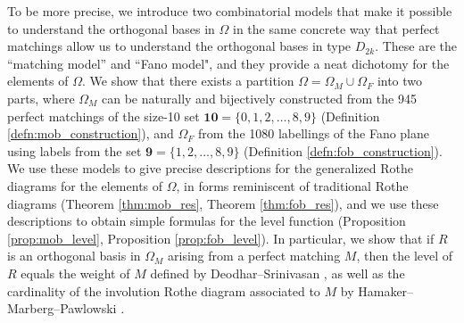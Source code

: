 \documentclass[11pt]{amsart}
\theoremstyle{plain}
\theoremstyle{definition}
\theoremstyle{remark}
\numberwithin{equation}{section}
\newcommand{\nine}{\mathbf{9}}
\newcommand{\ten}{\mathbf{10}}
\newcommand{\ob}{\Omega}
\newcommand{\fob}{\Omega_F}
\begin{document}
To be more precise, we introduce two combinatorial models that make it possible
to understand the orthogonal bases in $\ob$ in the same concrete way that
perfect matchings allow us to understand the orthogonal bases in type $D_{2k}$.
These are the ``matching model'' and ``Fano model", and they provide a neat
dichotomy for the elements of $\ob$. We show that there exists a partition
$\ob=\ob_M \cup \ob_F$ into two parts, where $\ob_M$ can be naturally and
bijectively constructed from the 945 perfect matchings of the size-10 set
$\ten=\{0,1,2,\dots, 8,9\}$ (Definition \ref{defn:mob_construction}), and
$\ob_F$ from the 1080 labellings of the Fano plane using labels from the set
$\nine=\{1,2,\dots, 8,9\}$ (Definition \ref{defn:fob_construction}).
We use these models to give precise descriptions for the generalized Rothe
diagrams for the elements of $\ob$, in forms reminiscent of traditional Rothe
diagrams (Theorem \ref{thm:mob_res}, Theorem \ref{thm:fob_res}), and we use
these descriptions to obtain simple formulas for the level function (Proposition
\ref{prop:mob_level}, Proposition \ref{prop:fob_level}). In particular, we show
that if $R$ is an orthogonal basis in $\ob_M$ arising from a perfect matching
$M$, then the level of $R$ equals the weight of $M$ defined by
Deodhar--Srinivasan \cite{deodhar}, as well as the cardinality of the involution
Rothe diagram associated to $M$ by Hamaker--Marberg--Pawlowski \cite{hamaker20}. 
\end{document}
